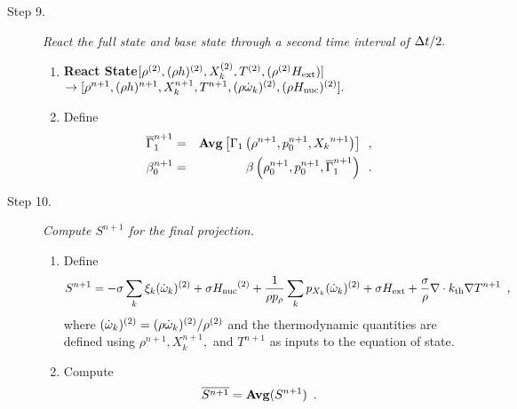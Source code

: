 \begin{description}
\begin{enumerate}
\end{enumerate}

\item[Step 9.] {\em React the full state and base state through a second time 
interval of $\Delta t / 2.$}

\begin{enumerate}
\renewcommand{\theenumi}{{\bf \alph{enumi}}}

\item {\bf React State}$[\rho^{(2)},(\rho h)^{(2)}, X_k^{(2)},T^{(2)}, (\rho^{(2)} {H_{\rm ext}}) ]$\\
                   $\rightarrow [\rho^{n+1}, (\rho h)^{n+1}, X_k^{n+1}, T^{n+1}, 
                               (\rho \dot{\omega}_k)^{(2)}, (\rho {H_{\rm nuc}})^{(2)} ].$  

\item Define
\begin{eqnarray}
 \overline{\Gamma}_1^{n+1}    &=& {\rm{\bf Avg}}\left[\Gamma_1\left(\rho^{n+1}, p_0^{n+1}, {X_k}^{n+1}\right) \right] \enskip , \\ 
 {\beta   }_0^{n+1}    &=& \beta   \left(\rho_0^{n+1}, p_0^{n+1},   \overline{\Gamma}_1^{n+1}\right) \enskip .
\end{eqnarray}

\end{enumerate}

\item[Step 10.] {\em Compute $S^{n+1}$ for the final projection.}

\begin{enumerate}
\renewcommand{\theenumi}{{\bf \alph{enumi}}}
\item Define
\begin{equation}
  S^{n+1} =  -\sigma  \sum_k  \xi_k (\dot{\omega}_k)^{(2)}  + \sigma {H_{\rm nuc}}^{(2)} +
  \frac{1}{\rho p_\rho} \sum_k p_{X_k}  ({\dot{\omega}}_k)^{(2)}  
   + \sigma {H_{\rm ext}} + \frac{\sigma}{\rho}\nabla\cdot k_{\rm th}\nabla T^{n+1} \enskip ,
\end{equation}
where $(\dot{\omega}_k)^{(2)} = (\rho \dot{\omega}_k)^{(2)} / \rho^{(2)}$
and the thermodynamic quantities are defined using $\rho^{n+1}, X_k^{n+1},$
and $T^{n+1}$ as inputs to the equation of state.

\item Compute
\begin{equation}
\overline{S^{n+1}} = {\mathrm{\bf Avg}} (S^{n+1}) \enskip.
\end{equation}


\end{enumerate}
\end{description}
